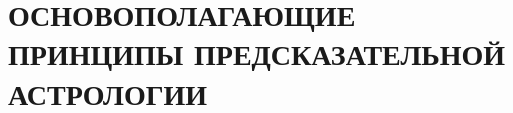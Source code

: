 \chapter[ОСНОВОПОЛАГАЮЩИЕ ПРИНЦИПЫ]{ОСНОВОПОЛАГАЮЩИЕ ПРИНЦИПЫ ПРЕДСКАЗАТЕЛЬНОЙ АСТРОЛОГИИ}












